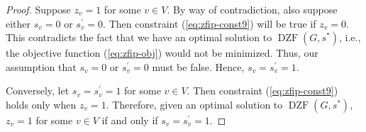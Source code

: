 \documentclass{article}
\newcommand\dzf[1]{\operatorname{DZF}\left(#1\right)}
\theoremstyle{definition}
\begin{document}
\begin{proof}
Suppose $z_v = 1$ for some $v \in V$.
By way of contradiction, also suppose either $s_v = 0$ or $s_v^{'} = 0$.
Then constraint  (\ref{eq:zfip-const9}) will be true if $z_v = 0$.
This contradicts the fact that we have an optimal solution to $\dzf{G,s^{*}}$, i.e., the objective function (\ref{eq:zfip-obj}) would not be minimized.
Thus, our assumption that $s_v = 0$ or $s_v^{'} = 0$ must be false.
Hence, $s_v = s_v^{'} = 1$.

Conversely, let $s_v = s_v^{'} = 1$ for some $v \in V$.
Then constraint (\ref{eq:zfip-const9}) holds only when $z_v = 1$. 
Therefore, given an optimal solution to $\dzf{G,s^{*}}$, $z_v = 1$ for some $v \in V$ if and only if $s_v = s_v^{'} = 1$.
\end{proof}
\end{document}

